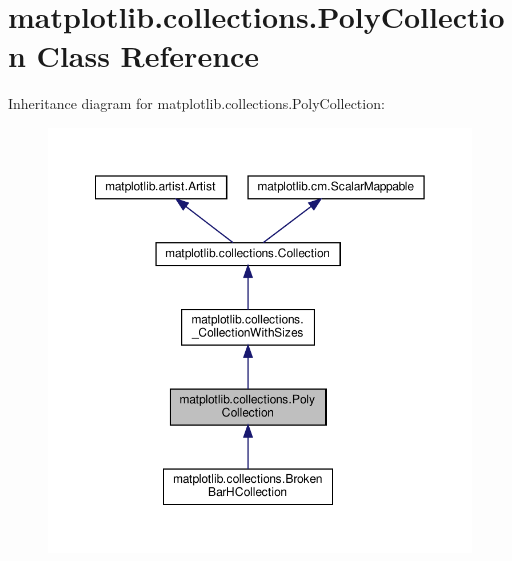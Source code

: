 \hypertarget{classmatplotlib_1_1collections_1_1PolyCollection}{}\section{matplotlib.\+collections.\+Poly\+Collection Class Reference}
\label{classmatplotlib_1_1collections_1_1PolyCollection}


Inheritance diagram for matplotlib.\+collections.\+Poly\+Collection\+:
\nopagebreak
\begin{figure}[H]
\begin{center}
\leavevmode
\includegraphics[width=350pt]{classmatplotlib_1_1collections_1_1PolyCollection__inherit__graph}
\end{center}
\end{figure}


